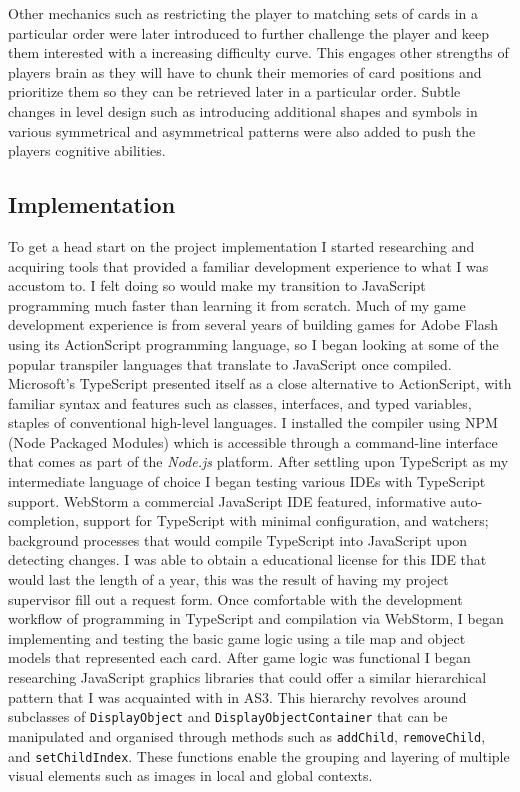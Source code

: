 \documentclass[final]{cmpreport}
\begin{document}
Other mechanics such as restricting the player to matching sets of cards in a particular order were later introduced to further challenge the player and keep them interested with a increasing difficulty curve. This engages other strengths of players brain as they will have to chunk their memories of card positions and prioritize them so they can be retrieved later in a particular order. Subtle changes in level design such as introducing additional shapes and symbols in various symmetrical and asymmetrical patterns were also added to push the players cognitive abilities.

\subsection{Implementation}

To get a head start on the project implementation I started researching and acquiring tools that provided a familiar development experience to what I was accustom to. I felt doing so would make my transition to JavaScript programming much faster than learning it from scratch. Much of my game development experience is from several years of building games for Adobe Flash using its ActionScript programming language, so I began looking at some of the popular transpiler languages that translate to JavaScript once compiled. Microsoft's TypeScript presented itself as a close alternative to ActionScript, with familiar syntax and features such as classes, interfaces, and typed variables, staples of conventional high-level languages. I installed the compiler using NPM (Node Packaged Modules) which is accessible through a command-line interface that comes as part of the \textit{Node.js} platform. After settling upon TypeScript as my intermediate language of choice I began testing various IDEs with TypeScript support. WebStorm a commercial JavaScript IDE featured, informative auto-completion, support for TypeScript with minimal configuration, and watchers; background processes that would compile TypeScript into JavaScript upon detecting changes. I was able to obtain a educational license for this IDE that would last the length of a year, this was the result of having my project supervisor fill out a request form. Once comfortable with the development workflow of programming in TypeScript and compilation via WebStorm, I began implementing and testing the basic game logic using a tile map and object models that represented each card. After game logic was functional I began researching JavaScript graphics libraries that could offer a similar hierarchical pattern that I was acquainted with in AS3. This hierarchy revolves around subclasses of \texttt{DisplayObject} and \texttt{DisplayObjectContainer} that can be manipulated and organised through methods such as \texttt{addChild}, \texttt{removeChild}, and \texttt{setChildIndex}. These functions enable the grouping and layering of multiple visual elements such as images in local and global contexts.
\end{document}
